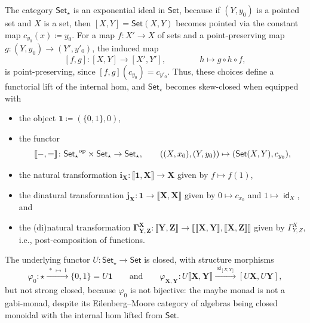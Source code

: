 \documentclass[12pt,dvipsnames,oneside]{amsart}
\theoremstyle{plain}
\theoremstyle{remark}
\theoremstyle{definition}
\DeclareMathOperator{\id}{\mathsf{id}}
\newcommand*{\from}{\colon}
\newcommand*{\blank}{{-}}
\newcommand*{\bblank}{{=}}
\newcommand{\Set}{\mathsf{Set}}
\newcommand{\op}{^{\textup{op}}}
\newcommand*{\term}{{\star}}
\newcommand{\forget}{U}
\newcommand*{\defeq}{\coloneqq}
\begin{document}
The category \(\Set_\term\) is an exponential ideal in \(\Set\), because if \((Y,y_0)\) is a pointed set and \(X\) is a set, then \([X,Y] = \Set(X,Y)\) becomes pointed via the constant map \(c_{y_0}(x) \defeq y_0\).
For a map \(f\colon X' \to X\) of sets and a point-preserving map \(g\colon (Y,y_0) \to (Y',y'_0)\), the induced map
\[
  [f,g]\colon [X,Y] \to [X',Y'],
  \qquad\qquad
  h \mapsto g \circ h \circ f,
\]
is point-preserving, since \([f,g](c_{y_0})=c_{y'_0}\).
Thus, these choices define a functorial lift of the internal hom,
and \(\Set_\term\) becomes skew-closed when equipped with
\begin{itemize}[leftmargin=0.8cm]
    \item the object \(\boldsymbol{1} \defeq (\{0,1\}, 0)\),

    \item the functor
    \[\llbracket \blank,\bblank \rrbracket\from {\Set_\term}\op \times \Set_\term \to \Set_\term, \qquad ((X,x_0),(Y,y_0)) \mapsto (\Set(X,Y),c_{y_0}),\]

    \item the natural transformation \(\boldsymbol{i}_{\boldsymbol{X}} \colon \llbracket \boldsymbol{1},\boldsymbol{X} \rrbracket \to \boldsymbol{X}\) given by \(f \mapsto f(1)\),

    \item the dinatural transformation \(\boldsymbol{j}_{\boldsymbol{X}} \colon \boldsymbol{1} \to \llbracket \boldsymbol{X},\boldsymbol{X} \rrbracket\)
    given by \(0 \mapsto c_{x_0}\) and \(1 \mapsto \id_X\), and

    \item the (di)natural transformation \(\boldsymbol{\Gamma}_{\boldsymbol{Y},\boldsymbol{Z}}^{\boldsymbol{X}} \colon \llbracket \boldsymbol{Y},\boldsymbol{Z} \rrbracket \to \llbracket \llbracket \boldsymbol{X},\boldsymbol{Y} \rrbracket,\llbracket \boldsymbol{X},\boldsymbol{Z} \rrbracket \rrbracket\)
    given by \(\Gamma_{Y,Z}^X\), i.e., post-composition of functions.
\end{itemize}
The underlying functor \(\forget \colon \Set_\star \to \Set\) is closed, with structure morphisms
\[
    \varphi_0\from \term \xrightarrow{\ \ast \, \mapsto \, 1\ } \{0,1\} = \forget\boldsymbol{1}
    \qquad\text{and}\qquad
    \varphi_{\boldsymbol{X},\boldsymbol{Y}} \from \forget\llbracket\boldsymbol{X},\boldsymbol{Y}\rrbracket \xrightarrow{\ \id_{[X,Y]}\ } [\forget\boldsymbol{X},\forget\boldsymbol{Y}],
\]
but not strong closed, because \(\varphi_0\) is not bijective: the maybe monad is not a gabi-monad, despite its Eilenberg--Moore category of algebras being closed monoidal with the internal hom lifted from \(\Set\).
\end{document}
